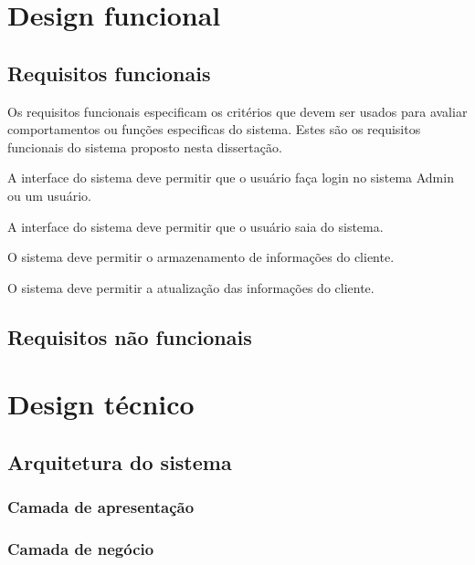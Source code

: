\section{Design funcional}











\subsection{Requisitos funcionais}


Os requisitos funcionais especificam os critérios que devem ser usados ​​para avaliar comportamentos ou funções especificas do sistema. Estes são os requisitos funcionais do sistema proposto nesta dissertação. 


A interface do sistema deve permitir que o usuário faça login no sistema
Admin ou um usuário.


A interface do sistema deve permitir que o usuário saia do sistema.



O sistema deve permitir o armazenamento de informações do cliente.


O sistema deve permitir a atualização das informações do cliente.


\subsection{Requisitos não funcionais}







\section{Design técnico}



\subsection{Arquitetura do sistema}



\subsubsection{Camada de apresentação}


\subsubsection{Camada de negócio}



